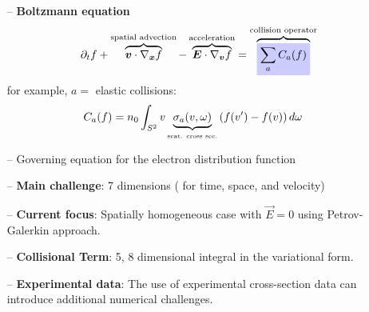\documentclass[landscape,archE,fontscale=0.285]{baposter} %
\newcommand{\vect}[1]{\boldsymbol{#1}}
\newcommand{\mathcolorbox}[2]{\colorbox{#1}{$\displaystyle #2$}}
\begin{document}
\begin{poster}
{\begin{itemize}[leftmargin=*]
\item[--] \textbf{Boltzmann equation}
\begin{align*}
\partial_t f + \overbrace{\vect{v}\cdot \nabla_{\vect{x}} f}^{\text{spatial advection}}  - \overbrace{\vect{E} \cdot \nabla_{\vect{v}}f}^{\text{acceleration}} = \overbrace{\mathcolorbox{blue!20}{\sum_{a} C_a(f)}}^{\text{collision operator}}
\end{align*}
for example, $a=$ elastic collisions:
\begin{align*}
C_a(f) &= n_0\int_{S^2} v \underbrace{\sigma_a(v,\omega)}_{\tiny\text{\tiny scat. cross sec.}} 
\left( f(v^\prime) - f(v) \right) d \omega 
\end{align*}
\item[--] Governing equation for the electron distribution function
\item[--] \textbf{Main challenge}: 7 dimensions ( for time, space, and velocity)
\item[--] \textbf{Current focus}: Spatially homogeneous case with $\vec{E}=0$ using Petrov-Galerkin approach. 
\item[--] \textbf{Collisional Term}: 5, 8 dimensional integral in the variational form.
\item[--] \textbf{Experimental data}: The use of experimental cross-section data can introduce additional numerical challenges.   


\end{itemize}


}



\end{poster}
\end{document}
